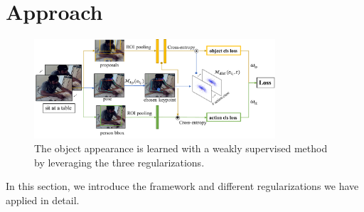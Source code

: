 \section{Approach}
\label{sec:approach}

\begin{figure}[ht!]
\centering
\includegraphics[width=0.8\textwidth]{figures/pipeline.pdf}
\caption{The object appearance is learned with a weakly supervised method by leveraging the three regularizations.}
\label{fig:pipeline}
\end{figure}
In this section, we introduce the framework and different regularizations we have applied in detail.
